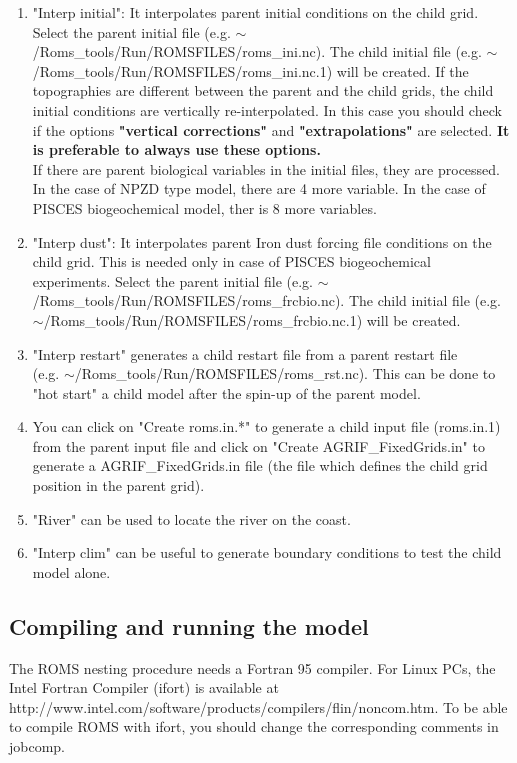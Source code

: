 \begin{enumerate}
\item "Interp initial": It interpolates parent initial
conditions on the child grid. Select the parent initial file
(e.g. $\sim$/Roms\_tools/Run/ROMSFILES/roms\_ini.nc).
The child initial file 
(e.g. $\sim$/Roms\_tools/Run/ROMSFILES/roms\_ini.nc.1) 
will be created.
If the topographies are different between the parent and 
the child grids, the child initial conditions are 
vertically re-interpolated. In this case you should check 
if the options \textbf{"vertical corrections"} and \textbf{"extrapolations"}
are selected. \textbf{It is preferable to always use these options.} \\
If there are parent biological variables in the initial files, they are processed. In
the case of NPZD type model, there are 4 more variable. In the case of PISCES
biogeochemical model, ther is 8 more variables. 

\item "Interp dust": It interpolates parent Iron dust forcing file conditions on the
  child grid.  This is needed only in case of PISCES biogeochemical experiments.
  Select the parent initial file (e.g.
  $\sim$/Roms\_tools/Run/ROMSFILES/roms\_frcbio.nc).  The child initial file (e.g.
  $\sim$/Roms\_tools/Run/ROMSFILES/roms\_frcbio.nc.1) will be created.
\item "Interp restart" generates a child restart file from 
a parent restart file \\
(e.g. $\sim$/Roms\_tools/Run/ROMSFILES/roms\_rst.nc). 
This can be done to "hot start" a child model after the 
spin-up of the parent model.

\item You can click on "Create roms.in.*" to generate a
child input file (roms.in.1) from the parent input
file and click on "Create AGRIF\_FixedGrids.in" to 
generate a AGRIF\_FixedGrids.in file (the file which
defines the child grid position in the parent grid).

\item "River" can be used to locate the river on the coast.

\item "Interp clim" can be useful to generate boundary conditions 
to test the child model alone. 
\end{enumerate}
\subsection{Compiling and running the model}
The ROMS nesting procedure needs a Fortran 95 compiler. For Linux PCs,
the Intel Fortran Compiler (ifort) is available at \\
http://www.intel.com/software/products/compilers/flin/noncom.htm.  To be able to
compile ROMS with ifort, you should change the corresponding
comments in jobcomp. \\

